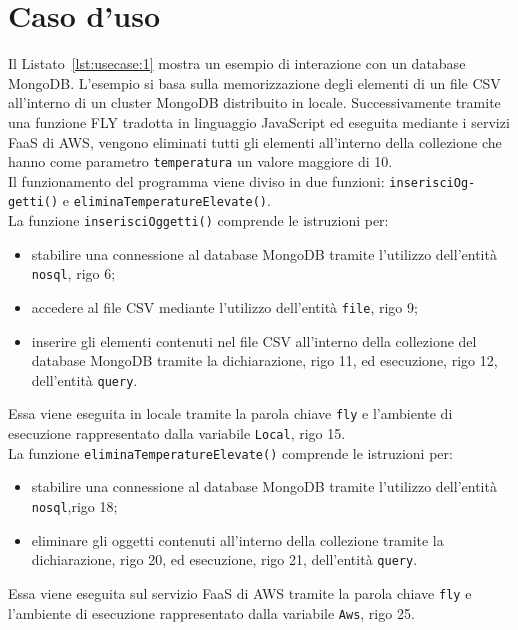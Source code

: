 \section{Caso d'uso}
Il Listato~\ref{lst:usecase:1} mostra un esempio di interazione con un database MongoDB. L'esempio si basa sulla memorizzazione degli elementi di un file CSV all'interno di un cluster MongoDB distribuito in locale. Successivamente tramite una funzione FLY tradotta in linguaggio JavaScript ed eseguita mediante i servizi FaaS di AWS, vengono eliminati tutti gli elementi all'interno della collezione che hanno come parametro \verb|temperatura| un valore maggiore di 10. \\
Il funzionamento del programma viene diviso in due funzioni: \verb|inserisciOg-| \verb|getti()| e \verb|eliminaTemperatureElevate()|. \\
La funzione \verb|inserisciOggetti()| comprende le istruzioni per: 
\begin{itemize}
    \item stabilire una connessione al database MongoDB tramite l'utilizzo dell'entità \verb|nosql|, rigo 6;
    \item accedere al file CSV mediante l'utilizzo dell'entità \verb|file|, rigo 9;
    \item inserire gli elementi contenuti nel file CSV all'interno della collezione del database MongoDB tramite la dichiarazione, rigo 11, ed esecuzione, rigo 12, dell'entità \verb|query|.
\end{itemize}
Essa viene eseguita in locale tramite la parola chiave \verb|fly| e l'ambiente di esecuzione rappresentato dalla variabile \verb|Local|, rigo 15. \\
La funzione \verb|eliminaTemperatureElevate()| comprende le istruzioni per:
\begin{itemize}
    \item stabilire una connessione al database MongoDB tramite l'utilizzo dell'entità \verb|nosql|,rigo 18;
    \item eliminare gli oggetti contenuti all'interno della collezione tramite la dichiarazione, rigo 20, ed esecuzione, rigo 21, dell'entità \verb|query|.
\end{itemize}
Essa viene eseguita sul servizio FaaS di AWS tramite la parola chiave \verb|fly| e l'ambiente di esecuzione rappresentato dalla variabile \verb|Aws|, rigo 25.
